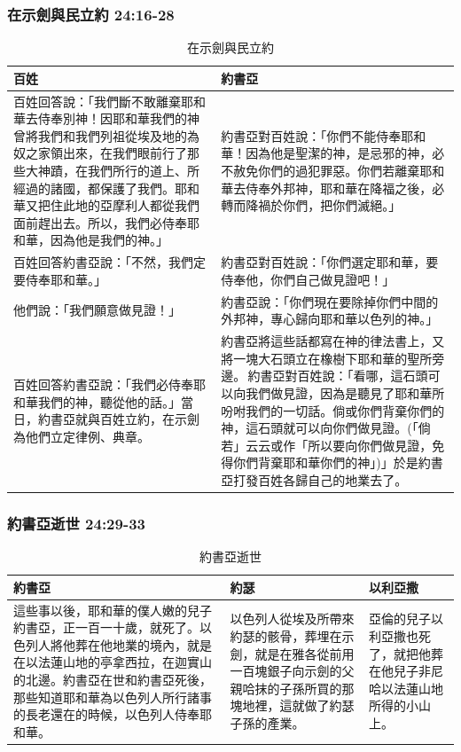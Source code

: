 \subsubsection{在示劍與民立約 24:16-28}
\begin{table}[H]
\centering
\begin{tabular}{p{7.75cm}|p{9.25cm}}\hline\hline
百姓&約書亞\\\hline
百姓回答說：「我們斷不敢離棄耶和華去侍奉別神！因耶和華我們的神曾將我們和我們列祖從埃及地的為奴之家領出來，在我們眼前行了那些大神蹟，在我們所行的道上、所經過的諸國，都保護了我們。耶和華又把住此地的亞摩利人都從我們面前趕出去。所以，我們必侍奉耶和華，因為他是我們的神。」&約書亞對百姓說：「你們不能侍奉耶和華！因為他是聖潔的神，是忌邪的神，必不赦免你們的過犯罪惡。你們若離棄耶和華去侍奉外邦神，耶和華在降福之後，必轉而降禍於你們，把你們滅絕。」\\\hline
百姓回答約書亞說：「不然，我們定要侍奉耶和華。」&約書亞對百姓說：「你們選定耶和華，要侍奉他，你們自己做見證吧！」\\\hline
他們說：「我們願意做見證！」&約書亞說：「你們現在要除掉你們中間的外邦神，專心歸向耶和華以色列的神。」 \\\hline
百姓回答約書亞說：「我們必侍奉耶和華我們的神，聽從他的話。」當日，約書亞就與百姓立約，在示劍為他們立定律例、典章。&約書亞將這些話都寫在神的律法書上，又將一塊大石頭立在橡樹下耶和華的聖所旁邊。 約書亞對百姓說：「看哪，這石頭可以向我們做見證，因為是聽見了耶和華所吩咐我們的一切話。倘或你們背棄你們的神，這石頭就可以向你們做見證。(「倘若」云云或作「所以要向你們做見證，免得你們背棄耶和華你們的神」)」於是約書亞打發百姓各歸自己的地業去了。\\\hline
 \end{tabular}
\caption{在示劍與民立約}
\end{table}

\subsubsection{約書亞逝世 24:29-33}
\begin{table}[H]
\centering
\begin{tabular}{p{8.75cm}|p{}|p{2.75cm}}\hline\hline
 約書亞&約瑟&以利亞撒 \\\hline
這些事以後，耶和華的僕人嫩的兒子約書亞，正一百一十歲，就死了。以色列人將他葬在他地業的境內，就是在以法蓮山地的亭拿西拉，在迦實山的北邊。約書亞在世和約書亞死後，那些知道耶和華為以色列人所行諸事的長老還在的時候，以色列人侍奉耶和華。&以色列人從埃及所帶來約瑟的骸骨，葬埋在示劍，就是在雅各從前用一百塊銀子向示劍的父親哈抹的子孫所買的那塊地裡，這就做了約瑟子孫的產業。&亞倫的兒子以利亞撒也死了，就把他葬在他兒子非尼哈以法蓮山地所得的小山上。\\\hline
\end{tabular}
\caption{約書亞逝世}
\end{table}











